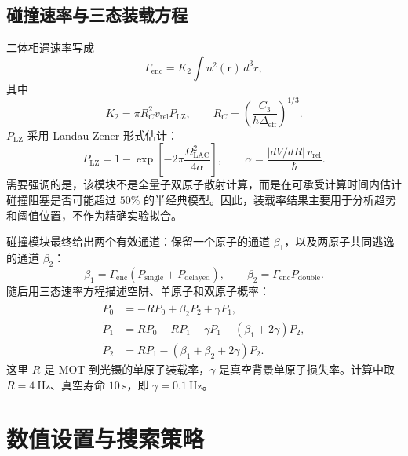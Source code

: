 \documentclass[UTF8,a4paper,12pt]{ctexart}
\begin{document}
\subsection{碰撞速率与三态装载方程}

二体相遇速率写成
\begin{equation}
\Gamma_{\mathrm{enc}}=K_2\int n^2(\bm r)\,d^3r,
\end{equation}
其中
\begin{equation}
K_2=\pi R_C^2 v_{\mathrm{rel}} P_{\mathrm{LZ}},\qquad
R_C=\left(\frac{C_3}{h\Delta_{\mathrm{eff}}}\right)^{1/3}.
\end{equation}
$P_{\mathrm{LZ}}$ 采用 Landau-Zener 形式估计：
\begin{equation}
P_{\mathrm{LZ}}=1-\exp\!\left[-2\pi\frac{\Omega_{\mathrm{LAC}}^2}{4\alpha}\right],
\qquad
\alpha=\frac{|dV/dR|\,v_{\mathrm{rel}}}{\hbar}.
\end{equation}
需要强调的是，该模块不是全量子双原子散射计算，而是在可承受计算时间内估计碰撞阻塞是否可能超过 $50\%$ 的半经典模型。因此，装载率结果主要用于分析趋势和阈值位置，不作为精确实验拟合。

碰撞模块最终给出两个有效通道：保留一个原子的通道 $\beta_1$，以及两原子共同逃逸的通道 $\beta_2$：
\begin{equation}
\beta_1=\Gamma_{\mathrm{enc}}\left(P_{\mathrm{single}}+P_{\mathrm{delayed}}\right),
\qquad
\beta_2=\Gamma_{\mathrm{enc}}P_{\mathrm{double}}.
\end{equation}
随后用三态速率方程描述空阱、单原子和双原子概率：
\begin{align}
\dot P_0&=-RP_0+\beta_2P_2+\gamma P_1,\\
\dot P_1&=RP_0-RP_1-\gamma P_1+(\beta_1+2\gamma)P_2,\\
\dot P_2&=RP_1-(\beta_1+\beta_2+2\gamma)P_2.
\label{eq:loading_rate}
\end{align}
这里 $R$ 是 MOT 到光镊的单原子装载率，$\gamma$ 是真空背景单原子损失率。计算中取 $R=4~\mathrm{Hz}$、真空寿命 $10~\mathrm{s}$，即 $\gamma=0.1~\mathrm{Hz}$。

\section{数值设置与搜索策略}
\end{document}

